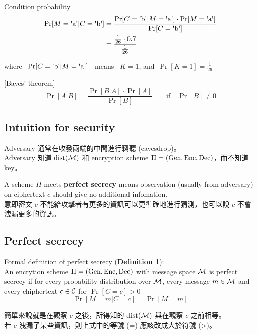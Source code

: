 Condition probability
\begin{align*}
	\Pr[M = \text{\textquotesingle{}a\textquotesingle} | C =  \text{\textquotesingle{}b\textquotesingle}] &=
	\frac{
		\Pr[C = \text{\textquotesingle{}b\textquotesingle} | M = \text{\textquotesingle{}a\textquotesingle}] \cdot \Pr[M = \text{\textquotesingle{}a\textquotesingle}]
	}
	{\Pr[C = \text{\textquotesingle{}b\textquotesingle}]} \\
	&= \frac{\frac{1}{26} \cdot 0.7}{\frac{1}{26}}
\end{align*}

where \, \(\Pr[C = \text{\textquotesingle{}b\textquotesingle} | M = \text{\textquotesingle{}a\textquotesingle}]\) \, means \, \(K = 1\), and\, \(\Pr[K = 1] = \frac{1}{26}\)

[Bayes' theorem]
\[\Pr[A|B] = \frac{\Pr[B|A] \cdot \Pr[A]}{\Pr[B]} \qquad \text{if} \quad \Pr[B] \neq 0\]


\subsection{Intuition for security}

Adversary 通常在收發兩端的中間進行竊聽 (eavesdrop)。 \\
Adversary 知道 \(\operatorname{dist}(\operatorname{\mathcal{M}})\) 和 encryption scheme \(\Pi = (\operatorname{Gen}, \operatorname{Enc}, \operatorname{Dec})\)，而不知道 key。

A scheme \(\Pi\) meets \textbf{perfect secrecy} means observation (usually from adversary) on ciphertext \(c\) should give no additional infomation. \\
意即密文 \(c\) 不能給攻擊者有更多的資訊可以更準確地進行猜測，也可以說 \(c\) 不會洩漏更多的資訊。


\subsection{Perfect secrecy}

Formal definition of perfect secrecy (\textbf{Definition 1}): \\
An encrytion scheme \(\Pi = (\operatorname{Gen}, \operatorname{Enc}, \operatorname{Dec})\) with message space \(\operatorname{\mathcal{M}}\) is perfect secrecy if for every probability distribution over \(\operatorname{\mathcal{M}}\), every message \(m \in \operatorname{\mathcal{M}}\) and every chiphertext \(c \in \operatorname{\mathcal{C}}\) for \(\Pr[C = c] > 0\)
\[\Pr[M = m | C = c] = \Pr[M = m]\]

簡單來說就是在觀察 \(c\) 之後，所得知的 \(\operatorname{dist}(\operatorname{\mathcal{M}})\) 與在觀察 \(c\) 之前相等。 \\
若 \(c\) 洩漏了某些資訊，則上式中的等號 (=) 應該改成大於符號 (>)。


